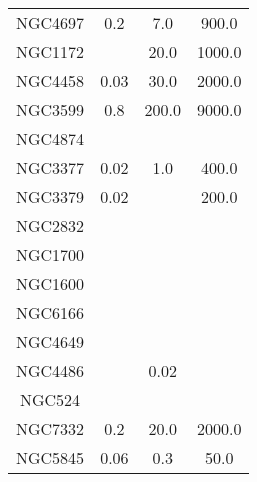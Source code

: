 \begin{table}
\begin{tabular}{cccc}
NGC4697 & 0.2 & 7.0 & 900.0 \\
NGC1172 &  & 20.0 & 1000.0 \\
NGC4458 & 0.03 & 30.0 & 2000.0 \\
NGC3599 & 0.8 & 200.0 & 9000.0 \\
NGC4874 &  &  &  \\
NGC3377 & 0.02 & 1.0 & 400.0 \\
NGC3379 & 0.02 &  & 200.0 \\
NGC2832 &  &  &  \\
NGC1700 &  &  &  \\
NGC1600 &  &  &  \\
NGC6166 &  &  &  \\
NGC4649 &  &  &  \\
NGC4486 &  & 0.02 &  \\
NGC524 &  &  &  \\
NGC7332 & 0.2 & 20.0 & 2000.0 \\
NGC5845 & 0.06 & 0.3 & 50.0 \\
\end{tabular}
\hline
\end{table}
